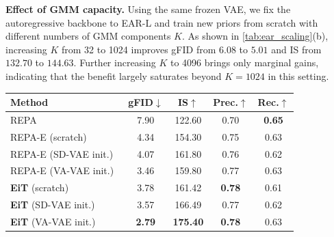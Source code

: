 \documentclass[]{bytedance_seed}
\begin{document}
\textbf{Effect of GMM capacity.}
Using the same frozen VAE, we fix the autoregressive backbone to EAR-L and train new priors from scratch with different numbers of GMM components $K$.
As shown in \cref{tab:ear_scaling}(b), increasing $K$ from 32 to 1024 improves gFID from $6.08$ to $5.01$ and IS from $132.70$ to $144.63$.
Further increasing $K$ to 4096 brings only marginal gains, indicating that the benefit largely saturates beyond $K=1024$ in this setting.


\begin{table}[!t]
\centering

\begin{minipage}[t]{0.6\textwidth}
\vspace{0pt}
\centering
{}
\label{tab:vae_initialization}

\scriptsize
\setlength{\tabcolsep}{3.0pt}
\begin{tabular}{lcccc}
\toprule
\textbf{Method}
& \textbf{gFID}$\downarrow$
& \textbf{IS}$\uparrow$
& \textbf{Prec.}$\uparrow$
& \textbf{Rec.}$\uparrow$ \\
\midrule
REPA~\cite{repa}
& 7.90 & 122.60 & 0.70 & \textbf{0.65} \\

REPA-E (scratch)~\cite{repa_e}
& 4.34 & 154.30 & 0.75 & 0.63 \\

REPA-E (SD-VAE init.)~\cite{repa_e}
& 4.07 & 161.80 & 0.76 & 0.62 \\

REPA-E (VA-VAE init.)~\cite{repa_e}
& 3.46 & 159.80 & 0.77 & 0.63 \\

\textbf{EiT} (scratch)
& 3.78 & 161.42 & \textbf{0.78} & 0.61 \\

\textbf{EiT} (SD-VAE init.)
& 3.57 & 166.49 & 0.77 & 0.62 \\

\textbf{EiT} (VA-VAE init.)  
& \textbf{2.79} & \textbf{175.40} & \textbf{0.78} & 0.63 \\
\bottomrule
\end{tabular}
\end{minipage}
\hfill
\begin{minipage}[t]{0.37\textwidth}
\vspace{0pt}
\centering
{}
\label{tab:optional_nf}


\end{minipage}
\end{table}
\end{document}
